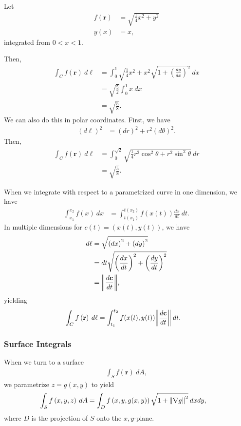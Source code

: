 \documentclass[10pt]{mypackage}
\begin{document}
\begin{example}
  Let
  \begin{align*}
    f\left(\mathbf{r}\right) &= \sqrt{\frac{1}{4}x^2 + y^2}\\
    y(x) &= x,
  \end{align*}
  integrated from $0 < x < 1$.\newline

  Then,
  \begin{align*}
    \int_{C}^{} f\left(\mathbf{r}\right)\:d\ell &= \int_{0}^{1} \sqrt{\frac{1}{4}x^2 + x^2}\sqrt{1 + \left(\frac{dy}{dx}\right)^2}\:dx\\
                                                &= \sqrt{\frac{5}{2}}\int_{0}^{1} x\:dx\\
                                                &= \sqrt{\frac{5}{8}}.
  \end{align*}
  We can also do this in polar coordinates. First, we have
  \begin{align*}
    \left(d\ell\right)^2 &= \left(dr\right)^2 + r^2\left(d\theta\right)^2.
  \end{align*}
  Then,
  \begin{align*}
    \int_{C}^{} f\left(\mathbf{r}\right)\:d\ell &= \int_{0}^{\sqrt{2}} \sqrt{\frac{1}{4}r^2\cos^2\theta + r^2\sin^2\theta}\:dr\\
                                                &= \sqrt{\frac{5}{8}}.
  \end{align*}
\end{example}
When we integrate with respect to a parametrized curve in one dimension, we have
\begin{align*}
  \int_{x_1}^{x_2} f(x)\:dx &= \int_{t(x_1)}^{t(x_2)} f\left(x(t)\right)\frac{dx}{dt}\:dt.
\end{align*}
In multiple dimensions for $c(t) = \left(x(t),y(t)\right)$, we have
\begin{align*}
  d\ell &= \sqrt{\left(dx\right)^2 + \left(dy\right)^2}\\
        &= dt\sqrt{\left(\frac{dx}{dt}\right)^2 + \left(\frac{dy}{dt}\right)^2}\\
        &= \norm{\frac{d\mathbf{c}}{dt}},
\end{align*}
yielding
\begin{align*}
  \int_{C}^{} f\left(\mathbf{r}\right)\:d\ell &= \int_{t_1}^{t_2} f(x(t),y(t))\norm{\frac{d\mathbf{c}}{dt}}\:dt.
\end{align*}
\subsubsection{Surface Integrals}%
When we turn to a surface
\begin{align*}
  \int_{S}^{} f\left(\mathbf{r}\right)\:dA,
\end{align*}
we parametrize $z = g(x,y)$ to yield
\begin{align*}
  \int_{S}^{} f\left(x,y,z\right)\:dA &= \int_{D}^{} f\left(x,y,g(x,y)\right)\sqrt{1 + \norm{\nabla g}^2}\:dx dy,
\end{align*}
where $D$ is the projection of $S$ onto the $x,y$-plane.
\end{document}
